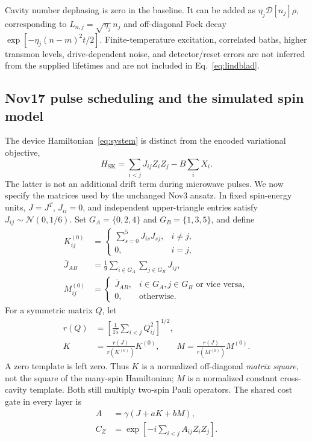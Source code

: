 \documentclass[aps,prb,reprint,amsmath,amssymb,nofootinbib]{revtex4-2}
\newcommand{\Diss}[1]{\mathcal{D}[#1]}
\begin{document}
Cavity number dephasing is zero in the baseline. It can be added as
$\eta_j\Diss{n_j}\rho$, corresponding to
$L_{n,j}=\sqrt{\eta_j}\,n_j$ and off-diagonal Fock decay
$\exp[-\eta_j(n-m)^2t/2]$.
Finite-temperature excitation, correlated baths, higher transmon levels,
drive-dependent noise, and detector/reset errors are not inferred from
the supplied lifetimes and are not included in Eq.~\eqref{eq:lindblad}.

\subsection{Nov17 pulse scheduling and the simulated spin model}

The device Hamiltonian~\eqref{eq:system} is distinct from the encoded
variational objective,
\begin{equation}
 H_{\mathrm{SK}}=\sum_{i<j}J_{ij}Z_iZ_j-B\sum_iX_i.
\end{equation}
The latter is not an additional drift term during microwave pulses.
We now specify the matrices used by the unchanged Nov3 ansatz. In fixed
spin-energy units, $J=J^T$, $J_{ii}=0$, and independent upper-triangle
entries satisfy $J_{ij}\sim\mathcal N(0,1/6)$. Set
$G_A=\{0,2,4\}$ and $G_B=\{1,3,5\}$, and define
\begin{align}
 K^{(0)}_{ij}&=\begin{cases}
       \sum_{s=0}^{5}J_{is}J_{sj},&i\ne j,\\0,&i=j,
       \end{cases}\\
 \bar J_{AB}&=\frac19\sum_{i\in G_A}\sum_{j\in G_B}J_{ij},\\
 M^{(0)}_{ij}&=\begin{cases}
       \bar J_{AB},&i\in G_A,j\in G_B\text{ or vice versa},\\
       0,&\text{otherwise}.
       \end{cases}
\end{align}
For a symmetric matrix $Q$, let
\begin{align}
 r(Q)&=\left[\frac1{15}\sum_{i<j}Q_{ij}^2\right]^{1/2},\\
 K&=\frac{r(J)}{r(K^{(0)})}K^{(0)},\qquad
 M=\frac{r(J)}{r(M^{(0)})}M^{(0)}.
\end{align}
A zero template is left zero. Thus $K$ is a normalized off-diagonal
\emph{matrix square}, not the square of the many-spin Hamiltonian;
$M$ is a normalized constant cross-cavity template. Both still multiply
two-spin Pauli operators. The shared cost gate in every layer is
\begin{align}
 A&=\gamma(J+aK+bM),\\
 C_Z&=\exp\!\left[-i\sum_{i<j}A_{ij}Z_iZ_j\right].
 \label{eq:cost}
\end{align}
\end{document}
